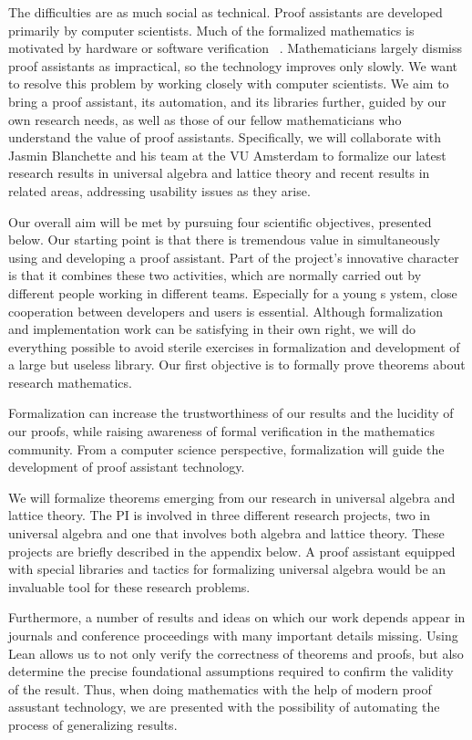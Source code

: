 \documentclass[11pt]{amsart}  %
\begin{document}
The difficulties are as much social as technical. Proof assistants are developed primarily by computer scientists. Much of the formalized mathematics is motivated by hardware or software verification
~\cite{boldo:2013,harrison:2003,hurd:2003,russinoff:1999}. Mathematicians largely dismiss proof assistants as impractical, so the technology improves only slowly. We want to resolve this problem by working closely with computer scientists. We aim to bring a proof assistant, its automation, and its libraries further, guided by our own research needs, as well as those of our fellow mathematicians who understand the value of proof assistants. Specifically, we will collaborate with Jasmin Blanchette and his team at the VU Amsterdam to formalize our latest research results in universal algebra and lattice theory and recent results in related areas, addressing usability issues as they arise.


Our overall aim will be met by pursuing four scientific objectives, presented below. Our starting point is that there is tremendous value in simultaneously using and developing a proof assistant. Part of the project's innovative character is that it combines these two activities, which are normally carried out by different people working in different teams. Especially for a young s
ystem, close cooperation between developers and users is essential. Although formalization and implementation work can be satisfying in their own right, we will do everything possible to avoid sterile exercises in formalization and development of a large but useless library. Our first objective is to formally prove theorems about research mathematics.

Formalization can increase the trustworthiness of our results and the lucidity of our proofs, while raising awareness of formal verification in the mathematics community. From a computer science perspective, formalization will guide the development of proof assistant technology.

We will formalize theorems emerging from our research in universal algebra and lattice theory. The PI is involved in three different research projects, two in universal algebra and one that involves both algebra and lattice theory.  These projects are briefly described in the appendix below. A proof assistant equipped with special libraries and tactics for formalizing universal algebra would be an invaluable tool for these research problems. 

Furthermore, a number of results and ideas on which our work depends appear in journals and conference proceedings with many important details missing.  Using Lean allows us to not only verify the correctness of theorems and proofs, but
also determine the precise foundational assumptions required to confirm the validity of the result. Thus, when doing mathematics with the help of modern proof assustant technology,  we are presented with the possibility of automating the process of generalizing results.
\end{document}

